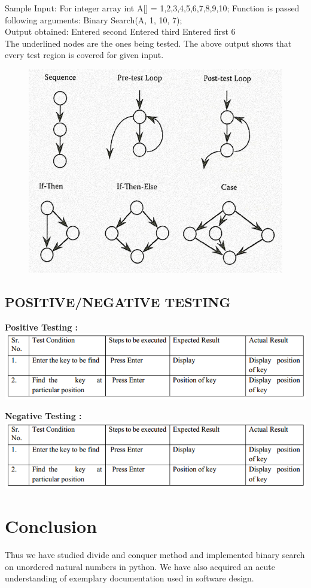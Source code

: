 \documentclass[10pt,a4paper]{article}
\begin{document}
Sample Input: For integer array int A[] = 1,2,3,4,5,6,7,8,9,10; Function 
is passed\\
following arguments: Binary Search(A, 1, 10, 7);\\
Output obtained: Entered second Entered third Entered first 6\\
The underlined nodes are the ones being tested. The above output shows
that every test region is covered for given input.\\
\begin{figure}[h!]
	\centering
	\includegraphics[scale=0.30]{CFG.png}
\end{figure}

\subsection{ POSITIVE/NEGATIVE TESTING }

\textbf{Positive Testing :}\\
\includegraphics[width=\textwidth]{binary_positive}
\vspace{30px}

\textbf{Negative Testing :}\\
\includegraphics[width=\textwidth]{binary_positive}

\section{Conclusion}
Thus we have studied divide and conquer method and implemented binary search on unordered natural numbers in python. We have also acquired an acute understanding of exemplary documentation used in software design.
\end{document}
